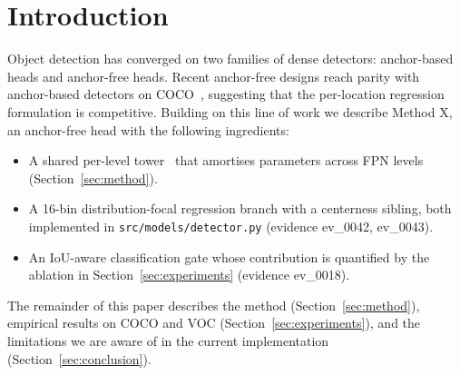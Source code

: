 \section{Introduction}
\label{sec:introduction}

Object detection has converged on two families of dense detectors: anchor-based
heads and anchor-free heads. Recent anchor-free designs reach parity with
anchor-based detectors on COCO~\citep{smith2024examplekey}, suggesting that the
per-location regression formulation is competitive. Building on this line of
work we describe Method X, an anchor-free head with the following ingredients:

\begin{itemize}
  \item A shared per-level tower~\citep{chen2023anchorfreebaseline} that
        amortises parameters across FPN levels (Section~\ref{sec:method}).
  \item A 16-bin distribution-focal regression branch with a centerness
        sibling, both implemented in \texttt{src/models/detector.py}
        (evidence ev\_0042, ev\_0043).
  \item An IoU-aware classification gate whose contribution is quantified by
        the ablation in Section~\ref{sec:experiments} (evidence ev\_0018).
\end{itemize}

The remainder of this paper describes the method (Section~\ref{sec:method}),
empirical results on COCO and VOC (Section~\ref{sec:experiments}), and the
limitations we are aware of in the current implementation
(Section~\ref{sec:conclusion}).
